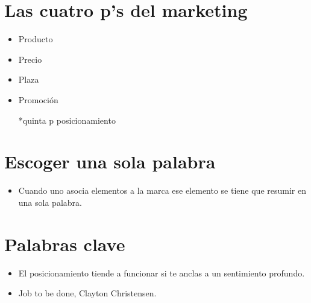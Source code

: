 \section{Las cuatro p's del marketing}
\begin{itemize}
    \item Producto 
    \item Precio 
    \item Plaza 
    \item Promoción 
    \item[*quinta p] posicionamiento 
\end{itemize}


\section{Escoger una sola palabra}
\begin{itemize}
    \item Cuando uno asocia elementos a la marca ese elemento se tiene que resumir en una sola palabra. 
\end{itemize}


\section{Palabras clave}
\begin{itemize}
    \item El posicionamiento tiende a funcionar si te anclas a un sentimiento profundo.
    \item Job to be done, Clayton Christensen.
\end{itemize}
